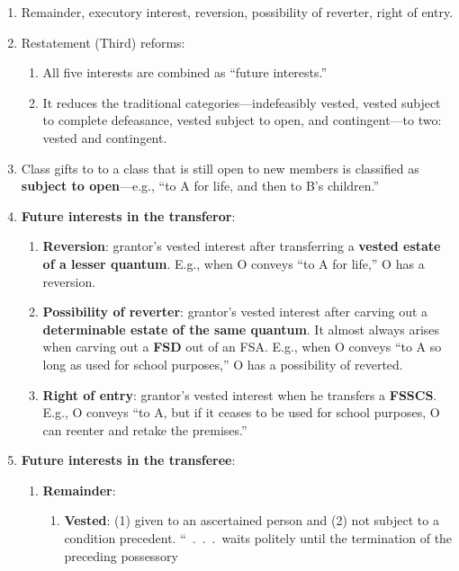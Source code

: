\begin{enumerate}
    \item Remainder, executory interest, reversion, possibility of reverter, 
    right of entry.
    \item Restatement (Third) reforms:
    \begin{enumerate}
        \item All five interests are combined as ``future interests.''
        \item It reduces the traditional categories---indefeasibly vested, 
        vested subject to complete defeasance, vested subject to open, and 
        contingent---to two: vested and contingent.
    \end{enumerate}
    \item Class gifts to to a class that is still open to new members is 
    classified as \textbf{subject to open}---e.g., ``to A for life, and then 
    to B's children.''
    \item \textbf{Future interests in the transferor}:
    \begin{enumerate}
        \item \textbf{Reversion}: grantor's vested interest after transferring 
        a \textbf{vested estate of a lesser quantum}. E.g., when O conveys 
        ``to A for life,'' O has a reversion.
        \item \textbf{Possibility of reverter}: grantor's vested interest 
        after carving out a \textbf{determinable estate of the same quantum}. 
        It almost always arises when carving out a \textbf{FSD} out of an FSA. 
        E.g., when O conveys ``to A so long as used for school purposes,'' O 
        has a possibility of reverted.
        \item \textbf{Right of entry}: grantor's vested interest when he 
        transfers a \textbf{FSSCS}. E.g., O conveys ``to A, but if it ceases 
        to be used for school purposes, O can reenter and retake the 
        premises.''
    \end{enumerate}
    \item \textbf{Future interests in the transferee}:
    \begin{enumerate}
        \item \textbf{Remainder}:
        \begin{enumerate}
            \item \textbf{Vested}: (1) given to an ascertained person and (2) 
            not subject to a condition precedent. ``~.~.~.~waits politely 
            until the termination of the preceding possessory 

\end{enumerate}
\end{enumerate}
\end{enumerate}
